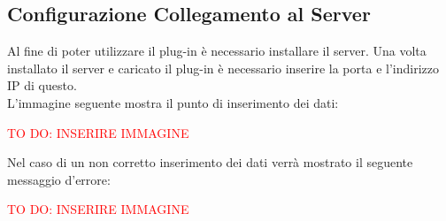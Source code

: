 \subsection{Configurazione Collegamento al Server}\label{CCS}

Al fine di poter utilizzare il plug-in è necessario installare il server.
Una volta installato il server e caricato il plug-in è necessario inserire la porta e l'indirizzo IP di questo. \\
L'immagine seguente mostra il punto di inserimento dei dati: 

\textcolor{red}{TO DO: INSERIRE IMMAGINE} 

Nel caso di un non corretto inserimento dei dati verrà mostrato il seguente messaggio d'errore:

\textcolor{red}{TO DO: INSERIRE IMMAGINE} 